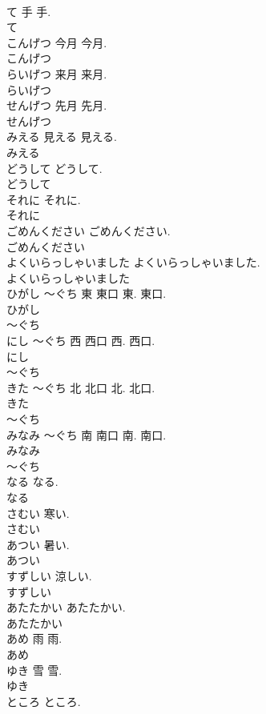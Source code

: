 \documentclass[8pt]{extreport}
\begin{document}
\begin{CJK}{UTF8}{min}
\\	て	手	手.	
\\	て
\\	こんげつ	今月	今月.	
\\	こんげつ
\\	らいげつ	来月	来月.	
\\	らいげつ
\\	せんげつ	先月	先月.	
\\	せんげつ
\\	みえる	見える	見える.	
\\	みえる
\\	どうして		どうして.	
\\	どうして
\\	それに		それに.	
\\	それに
\\	ごめんください		ごめんください.	
\\	ごめんください
\\	よくいらっしゃいました		よくいらっしゃいました.	
\\	よくいらっしゃいました
\\	ひがし ～ぐち	東 東口	東. 東口.	
\\	ひがし
\\	～ぐち
\\	にし ～ぐち	西 西口	西. 西口.	
\\	にし
\\	～ぐち
\\	きた ～ぐち	北 北口	北. 北口.	
\\	きた
\\	～ぐち
\\	みなみ ～ぐち	南 南口	南. 南口.	
\\	みなみ
\\	～ぐち
\\	なる		なる.	
\\	なる
\\	さむい		寒い.	
\\	さむい
\\	あつい		暑い.	
\\	あつい
\\	すずしい		涼しい.	
\\	すずしい
\\	あたたかい		あたたかい.	
\\	あたたかい
\\	あめ	雨	雨.	
\\	あめ
\\	ゆき	雪	雪.	
\\	ゆき
\\	ところ		ところ.	

\end{CJK}
\end{document}
